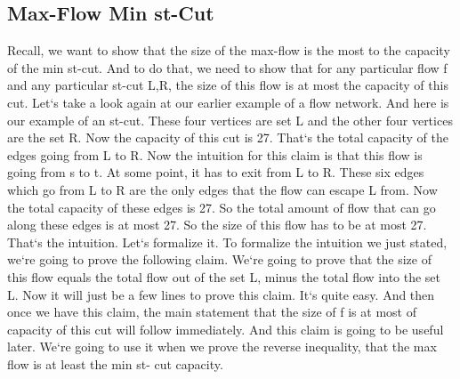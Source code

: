 \subsection{Max-Flow  Min st-Cut}
Recall, we want to show that the size of the max-flow is the most to the capacity of the min st-cut.
And to do that, we need to show that for any particular flow f and any particular st-cut L,R, the size of this flow is at most the capacity of this cut.
Let`s take a look again at our earlier example of a flow network.
And here is our example of an st-cut.
These four vertices are set L and the other four vertices are the set R\@.
Now the capacity of this cut is 27.
That`s the total capacity of the edges going from L to R\@.
Now the intuition for this claim is that this flow is going from s to t.
At some point, it has to exit from L to R\@.
These six edges which go from L to R are the only edges that the flow can escape L from.
Now the total capacity of these edges is 27.
So the total amount of flow that can go along these edges is at most 27.
So the size of this flow has to be at most 27.
That`s the intuition.
Let`s formalize it.
To formalize the intuition we just stated, we`re going to prove the following claim.
We`re going to prove that the size of this flow equals the total flow out of the set L, minus the total flow into the set L\@.
Now it will just be a few lines to prove this claim.
It`s quite easy.
And then once we have this claim, the main statement that the size of f is at most of capacity of this cut will follow immediately.
And this claim is going to be useful later.
We`re going to use it when we prove the reverse inequality, that the max flow is at least the min st- cut capacity.

